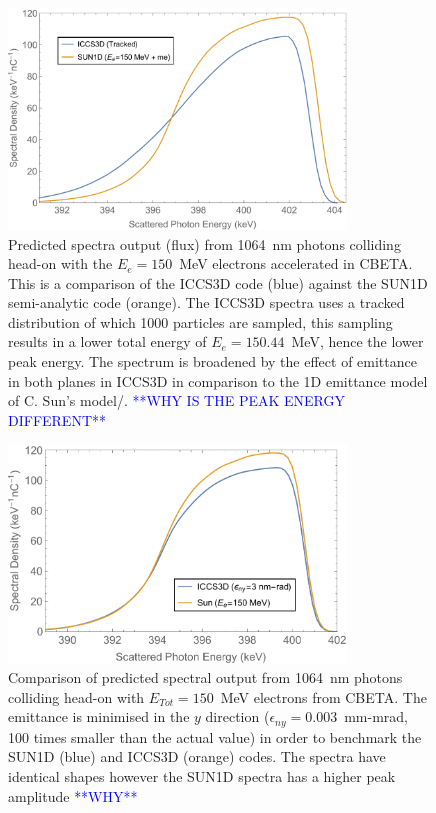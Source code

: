 \documentclass[../main.tex]{subfiles}
\begin{document}
\begin{figure}[!htb]
\centering
\includegraphics[width=0.8\textwidth]{Figures/CBETA_Inverse_Compton_Source_Design/CBETAICSSpectra.pdf}
\caption{Predicted spectra output (flux) from 1064~nm photons colliding head-on with the $E_{e}=150$~MeV electrons accelerated in CBETA. This is a comparison of the \textsc{ICCS3D} code (blue) against the \textsc{SUN1D} semi-analytic code (orange). The \textsc{ICCS3D} spectra uses a tracked distribution of which 1000 particles are sampled, this sampling results in a lower total energy of $E_{e}=150.44$~MeV, hence the lower peak energy.  The spectrum is broadened by the effect of emittance in both planes in \textsc{ICCS3D} in comparison to the 1D emittance model of C. Sun's model/. \textcolor{blue}{**WHY IS THE PEAK ENERGY DIFFERENT**}}
\label{fig:CBETA_ICS_Spectra_Comparison}
\end{figure}

\begin{figure}[!htb]
\centering
\includegraphics[width=0.8\textwidth]{Figures/CBETA_Inverse_Compton_Source_Design/150MeVBenchmarkSpectra.pdf}
\caption{Comparison of predicted spectral output from 1064~nm photons colliding head-on with $E_{Tot}=150$~MeV electrons from CBETA. The emittance is minimised in the $y$ direction ($\epsilon_{ny} = 0.003$~mm-mrad, 100 times smaller than the actual value) in order to benchmark the \textsc{SUN1D} (blue) and \textsc{ICCS3D} (orange) codes. The spectra have identical shapes however the \textsc{SUN1D} spectra has a higher peak amplitude \textcolor{blue}{**WHY**}}
\label{fig:CBETA_Benchmarking_Spectra}
\end{figure}
\end{document}
